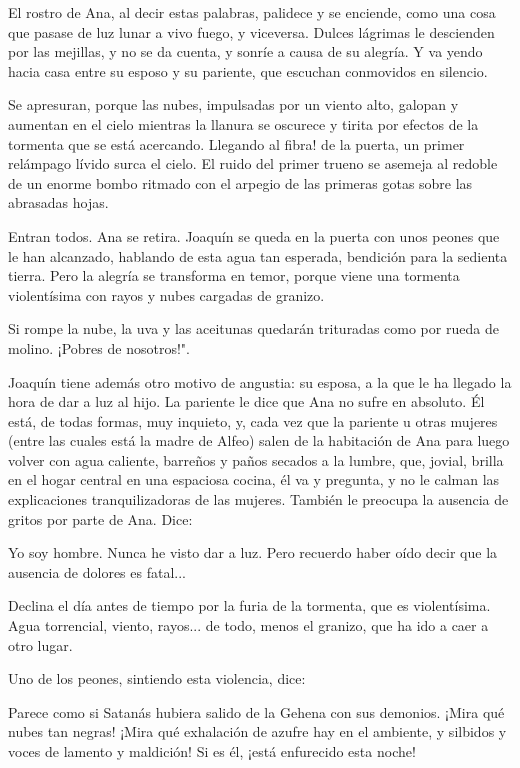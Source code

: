 \documentclass[12pt, twoside, openright]{book} %
\begin{document}
El rostro de Ana, al decir estas palabras, palidece y se enciende, como una cosa que pasase de luz lunar a vivo fuego, y viceversa. Dulces lágrimas le descienden por las mejillas, y no se da cuenta, y sonríe a causa de su alegría. Y va yendo hacia casa entre su esposo y su pariente, que escuchan conmovidos en silencio. 

Se apresuran, porque las nubes, impulsadas por un viento alto, galopan y aumentan en el cielo mientras la llanura se oscurece y tirita por efectos de la tormenta que se está acercando. Llegando al fibra! de la puerta, un primer relámpago lívido surca el cielo. El ruido del primer trueno se asemeja al redoble de un enorme bombo ritmado con el arpegio de las primeras gotas sobre las abrasadas hojas. 

Entran todos. Ana se retira. Joaquín se queda en la puerta con unos peones que le han alcanzado, hablando de esta agua tan esperada, bendición para la sedienta tierra. Pero la alegría se transforma en temor, porque viene una tormenta violentísima con rayos y nubes cargadas de granizo. 

Si rompe la nube, la uva y las aceitunas quedarán trituradas como por rueda de molino. ¡Pobres de nosotros!". 

Joaquín tiene además otro motivo de angustia: su esposa, a la que le ha llegado la hora de dar a luz al hijo. La pariente le dice que Ana no sufre en absoluto. Él está, de todas formas, muy inquieto, y, cada vez que la pariente u otras mujeres (entre las cuales está la madre de Alfeo) salen de la habitación de Ana para luego volver con agua caliente, barreños y paños secados a la lumbre, que, jovial, brilla en el hogar central en una espaciosa cocina, él va y pregunta, y no le calman las explicaciones tranquilizadoras de las mujeres. También le preocupa la ausencia de gritos por parte de Ana. Dice: 

Yo soy hombre. Nunca he visto dar a luz. Pero recuerdo haber oído decir que la ausencia de dolores es fatal...

Declina el día antes de tiempo por la furia de la tormenta, que es violentísima. Agua torrencial, viento, rayos... de todo, menos el granizo, que ha ido a caer a otro lugar. 

Uno de los peones, sintiendo esta violencia, dice: 

Parece como si Satanás hubiera salido de la Gehena con sus demonios. ¡Mira qué nubes tan negras! ¡Mira qué exhalación de azufre hay en el ambiente, y silbidos y voces de lamento y maldición! Si es él, ¡está enfurecido esta noche! 
\end{document}
